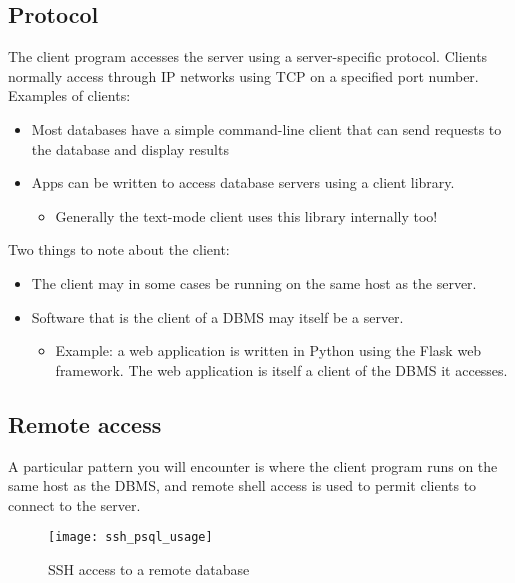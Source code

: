 \subsection{Protocol}

The client program accesses the server using a server-specific protocol.
Clients normally access through IP networks using TCP on a specified
port number. Examples of clients:

\begin{itemize}
\item
  Most databases have a simple command-line client that can send
  requests to the database and display results
\item
  Apps can be written to access database servers using a client library.

  \begin{itemize}
  
  \item
    Generally the text-mode client uses this library internally too!
  \end{itemize}
\end{itemize}

Two things to note about the client:

\begin{itemize}
\item
  The client may in some cases be running on the same host as the
  server.
\item
  Software that is the client of a DBMS may itself be a server.

  \begin{itemize}
  
  \item
    Example: a web application is written in Python using the Flask web framework.
    The web application is itself a client of the DBMS it accesses.
  \end{itemize}
\end{itemize}


\subsection{Remote access}

A particular pattern you will encounter is where the client program runs on the same host as the DBMS, and remote shell access is used to permit clients to connect to the server.

\begin{figure}[htbp]
  \centering
  \texttt{[image: ssh\_psql\_usage]}
  \caption{SSH access to a remote database}
  \label{fig:ssh-psql-usage}
\end{figure}


